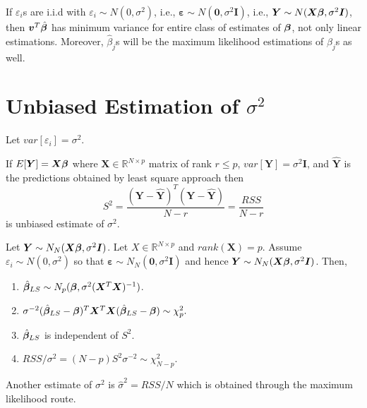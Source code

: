 If $\varepsilon_i$s are i.i.d with $\varepsilon_i \sim N(0, \sigma^2)$, i.e., 
$\bm \varepsilon \sim N(\bm 0, \sigma^2 \bm I)$,
i.e., $\bm Y \sim N(\bm X \bm \beta, \sigma^2 \bm I)$,
then $\bm v^T \hat {\bm \beta}$ has minimum variance for entire class 
of estimates of $\bm \beta$, not only linear estimations.
Moreover, $\hat \beta_j$s will be the maximum likelihood estimations of $\beta_j$s
as well.

\section{Unbiased Estimation of $\sigma^2$}
\label{sec:Unbiased-Estimation-of-sigma-regression}
Let $var[\varepsilon_i] = \sigma^2$.

\begin{thm}
If $E[\bm Y] = \bm X \bm \beta$ where $\bm X \in \mathbb{R}^{N \times p}$
matrix of rank $r \le p$, $var[\bm Y] = \sigma^2 \bm I$, and
$\hat{\bm Y}$ is the predictions obtained by least square approach
then
\[ S^2 = \frac{(\bm Y - \hat {\bm Y})^T (\bm Y - \hat {\bm Y})}{N -r} = \frac{RSS}{N-r} \]
is unbiased estimate of $\sigma^2$.
\end{thm}

\begin{thm}
Let $\bm Y \sim N_N(\bm X \bm \beta, \sigma^2 \bm I)$.
Let $X \in \mathbb{R}^{N \times p}$ and $rank(\bm X) = p$.
Assume $\varepsilon_i \sim N(0, \sigma^2)$ so that
$\bm \varepsilon \sim N_N(\bm 0, \sigma^2 \bm I)$ and hence
$\bm Y \sim N_N(\bm X \bm \beta, \sigma^2 \bm I)$. Then,
\begin{enumerate}[label=(\alph*)]
\item $\hat {\bm \beta}_{LS} \sim N_p(\bm \beta, \sigma^2 (\bm X^T\bm X)^{-1})$.

\item $\sigma^{-2} (\hat {\bm \beta}_{LS} -\bm \beta)^T \bm X^T \bm X (\hat {\bm \beta}_{LS} -\bm \beta) \sim \chi_p^2.$

\item $\hat {\bm \beta}_{LS}$ is independent of $S^2$.

\item $RSS/\sigma^2 = (N-p) S^2 \sigma^{-2} \sim \chi_{N - p}^2$.
\end{enumerate}
\end{thm}

Another estimate of $\sigma^2$ is
$\hat \sigma^2 = RSS/N$ which is obtained
through the maximum likelihood route.

